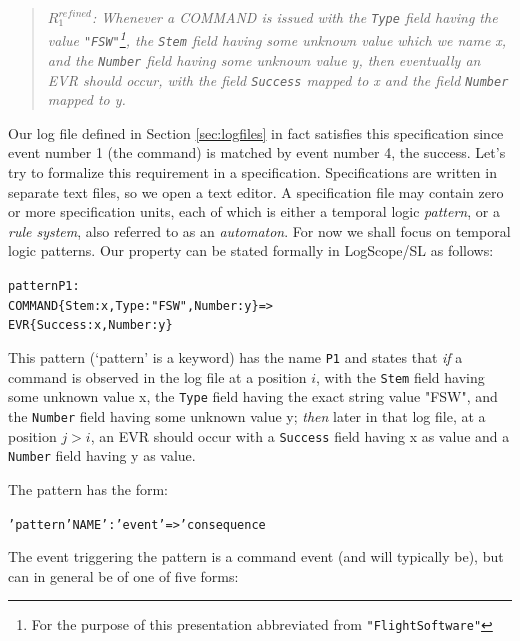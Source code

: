 \documentclass{report}
\newcommand{\logscopeSL}{{\sc LogScope/SL}}
\newenvironment{code}[1] %
{
\vspace{0.5cm}
\begin{center}
\begin{Sbox}
\begin{minipage}{11cm}
\begin{alltt}
{\bf\em #1}
}
{
\end{alltt}
\end{minipage}
\end{Sbox}
\setlength{\fboxsep}{8pt}
\fbox{\TheSbox}
\end{center}
\vspace{0.5cm}
}
\begin{document}
\begin{quote}
	{\em $R^{refined}_1$: Whenever a  COMMAND is issued with the {\tt Type} field having the value {\tt "FSW"}\footnote{For the 	purpose of this presentation abbreviated from {\tt "FlightSoftware"}}, the {\tt Stem} field having some unknown value 	which we name x,  and the {\tt Number} field having some unknown value y, then eventually an EVR should occur, with  	the field 	{\tt Success} mapped to x and the field {\tt Number} mapped to y.}
\end{quote}

\noindent Our log file defined in Section \ref{sec:logfiles} in fact satisfies this specification
since event number 1 (the command) is matched by event number 4, the success.
Let's try to formalize this requirement in a specification. Specifications are written in separate text files, 
so we open a text editor. A specification file may contain
zero or more specification units, each of which is either a temporal logic {\em pattern}, 
or a {\em rule system}, also referred to as an {\em automaton}.
For now we shall focus on temporal logic patterns. Our property can be stated formally in
\logscopeSL{} as follows:

\label{pattern:p1}

\begin{code}{}
  pattern P1:  
  	 COMMAND\{Stem: x, Type : "FSW", Number: y\} => 
       EVR\{Success: x, Number: y\}  
\end{code}

\noindent This pattern (`pattern' is a keyword) has the name {\tt P1} and
states that {\em if} a command is observed in the log file at a position $i$, 
with the {\tt Stem} field having some unknown value x, the {\tt Type} field having the exact string value
"FSW", and the {\tt Number} field having some unknown value y; {\em then} later in that log file, 
at a position $j > i$, an EVR should occur with a {\tt Success} field having x as value
and a {\tt Number} field having y as value.

\noindent The pattern has the form:

\label{pattern-syntax}

\begin{code}{}
  'pattern' NAME ':' event '=>' consequence
\end{code}

\noindent The event triggering the pattern is a command event (and will typically be), 
but can in general be of one of five forms: 
\end{document}
